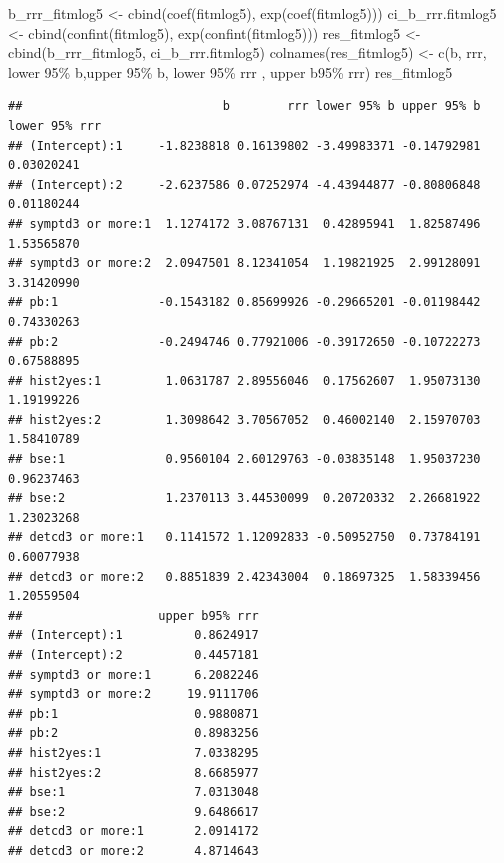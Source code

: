 \documentclass[
  10pt,
]{krantz}
\newenvironment{Shaded}{\begin{snugshade}}{\end{snugshade}}
\newcommand{\FunctionTok}[1]{\textcolor[rgb]{0.00,0.00,0.00}{#1}}
\newcommand{\NormalTok}[1]{#1}
\newcommand{\OtherTok}[1]{\textcolor[rgb]{0.56,0.35,0.01}{#1}}
\newcommand{\StringTok}[1]{\textcolor[rgb]{0.31,0.60,0.02}{#1}}
\begin{document}
\begin{Shaded}
\begin{Highlighting}[]
\NormalTok{b\_rrr\_fitmlog5 }\OtherTok{\textless{}{-}} \FunctionTok{cbind}\NormalTok{(}\FunctionTok{coef}\NormalTok{(fitmlog5), }\FunctionTok{exp}\NormalTok{(}\FunctionTok{coef}\NormalTok{(fitmlog5)))}
\NormalTok{ci\_b\_rrr.fitmlog5 }\OtherTok{\textless{}{-}} \FunctionTok{cbind}\NormalTok{(}\FunctionTok{confint}\NormalTok{(fitmlog5), }\FunctionTok{exp}\NormalTok{(}\FunctionTok{confint}\NormalTok{(fitmlog5)))}
\NormalTok{res\_fitmlog5 }\OtherTok{\textless{}{-}} \FunctionTok{cbind}\NormalTok{(b\_rrr\_fitmlog5, ci\_b\_rrr.fitmlog5)}
\FunctionTok{colnames}\NormalTok{(res\_fitmlog5) }\OtherTok{\textless{}{-}} \FunctionTok{c}\NormalTok{(}\StringTok{\textquotesingle{}b\textquotesingle{}}\NormalTok{, }\StringTok{\textquotesingle{}rrr\textquotesingle{}}\NormalTok{, }
                            \StringTok{\textquotesingle{}lower 95\% b\textquotesingle{}}\NormalTok{,}\StringTok{\textquotesingle{}upper 95\% b\textquotesingle{}}\NormalTok{, }
                            \StringTok{\textquotesingle{}lower 95\% rrr\textquotesingle{}}\NormalTok{ , }\StringTok{\textquotesingle{}upper b95\% rrr\textquotesingle{}}\NormalTok{)}
\NormalTok{res\_fitmlog5}
\end{Highlighting}
\end{Shaded}

\begin{verbatim}
##                            b        rrr lower 95% b upper 95% b lower 95% rrr
## (Intercept):1     -1.8238818 0.16139802 -3.49983371 -0.14792981    0.03020241
## (Intercept):2     -2.6237586 0.07252974 -4.43944877 -0.80806848    0.01180244
## symptd3 or more:1  1.1274172 3.08767131  0.42895941  1.82587496    1.53565870
## symptd3 or more:2  2.0947501 8.12341054  1.19821925  2.99128091    3.31420990
## pb:1              -0.1543182 0.85699926 -0.29665201 -0.01198442    0.74330263
## pb:2              -0.2494746 0.77921006 -0.39172650 -0.10722273    0.67588895
## hist2yes:1         1.0631787 2.89556046  0.17562607  1.95073130    1.19199226
## hist2yes:2         1.3098642 3.70567052  0.46002140  2.15970703    1.58410789
## bse:1              0.9560104 2.60129763 -0.03835148  1.95037230    0.96237463
## bse:2              1.2370113 3.44530099  0.20720332  2.26681922    1.23023268
## detcd3 or more:1   0.1141572 1.12092833 -0.50952750  0.73784191    0.60077938
## detcd3 or more:2   0.8851839 2.42343004  0.18697325  1.58339456    1.20559504
##                   upper b95% rrr
## (Intercept):1          0.8624917
## (Intercept):2          0.4457181
## symptd3 or more:1      6.2082246
## symptd3 or more:2     19.9111706
## pb:1                   0.9880871
## pb:2                   0.8983256
## hist2yes:1             7.0338295
## hist2yes:2             8.6685977
## bse:1                  7.0313048
## bse:2                  9.6486617
## detcd3 or more:1       2.0914172
## detcd3 or more:2       4.8714643
\end{verbatim}
\end{document}
